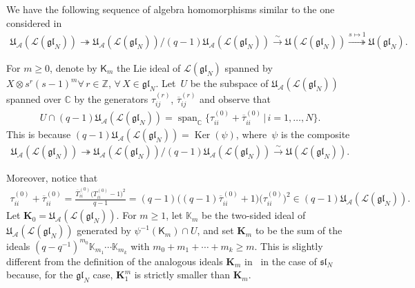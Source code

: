 \documentclass[pdftex]{sigma}
\numberwithin{theorem}{section}
\numberwithin{proposition}{section}
\numberwithin{lemma}{section}
\numberwithin{corollary}{section}
\numberwithin{definition}{section}
\numberwithin{example}{section}
\numberwithin{remark}{section}
\numberwithin{note}{section}
\DeclareMathOperator{\Ker}{Ker}
\numberwithin{equation}{section}
\begin{document}
We have the following sequence of algebra homomorphisms similar to the one considered in~\cite{GuMa}
\begin{gather*}
\mathfrak{U}_{\mathcal{A}}(\mathcal{L}(\mathfrak{gl}_N)) \twoheadrightarrow
\mathfrak{U}_{\mathcal{A}}(\mathcal{L}(\mathfrak{gl}_N)) /
(q-1)\mathfrak{U}_{\mathcal{A}}(\mathcal{L}(\mathfrak{gl}_N)) \stackrel{\sim}{\longrightarrow}
\mathfrak{U}(\mathcal{L}(\mathfrak{gl}_N)) \stackrel{s\mapsto 1}{\twoheadrightarrow}
\mathfrak{U}(\mathfrak{gl}_N).
\end{gather*}



For $m\ge 0$, denote by $\mathsf{K}_m$ the Lie ideal of $\mathcal{L}(\mathfrak{gl}_N)$
spanned by $X\otimes s^r (s-1)^m \forall\, r\in\mathbb{Z}$, $\forall\, X\in\mathfrak{gl}_N$.
Let~$U$ be the subspace of $\mathfrak{U}_{\mathcal{A}}(\mathcal{L}(\mathfrak{gl}_N))$ spanned over
$\mathbb{C}$ by the generators $\tau_{ij}^{(r)}$, $\overline{\tau}_{ij}^{(r)}$ and observe that
 \begin{gather*}
 U \cap (q-1){\mathfrak{U}}_{\mathcal{A}}({\mathcal{L}}({\mathfrak{gl}}_N))
 = \operatorname{span}_{\mathbb{C}} \big\{\tau_{ii}^{(0)}
 +\overline{\tau}_{ii}^{(0)} \,\big|\, i=1,\ldots,N\big\}.
\end{gather*}
This is because $(q-1)\mathfrak{U}_{\mathcal{A}}(\mathcal{L}(\mathfrak{gl}_N))=\Ker(\psi)$,
where~$\psi$ is the composite
\begin{gather*}
\mathfrak{U}_{\mathcal{A}}(\mathcal{L}(\mathfrak{gl}_N)) \twoheadrightarrow
\mathfrak{U}_{\mathcal{A}}(\mathcal{L}(\mathfrak{gl}_N)) /
(q-1)\mathfrak{U}_{\mathcal{A}}(\mathcal{L}(\mathfrak{gl}_N)) \stackrel{\sim}{\longrightarrow}
\mathfrak{U}(\mathcal{L}(\mathfrak{gl}_N)).
\end{gather*}

Moreover, notice that
\begin{gather*}
\tau_{ii}^{(0)}+\overline{\tau}_{ii}^{(0)} = \frac{\overline{T}_{ii}^{(0)}\big(T_{ii}^{(0)}-1\big)^2}{q-1} = (q-1)
\big((q-1)\overline{\tau}_{ii}^{(0)}+1\big) \big(\tau_{ii}^{(0)}\big)^2 \in
(q-1)\mathfrak{U}_{\mathcal{A}}(\mathcal{L}(\mathfrak{gl}_N)).
\end{gather*}
Let $\mathbf{K}_0 = \mathfrak{U}_{\mathcal{A}}(\mathcal{L}(\mathfrak{gl}_N))$.
For $m \geq 1$, let $\mathbb{K}_m$ be the two-sided ideal of
$\mathfrak{U}_{\mathcal{A}}(\mathcal{L}(\mathfrak{gl}_N))$ generated by $\psi^{-1}(\mathsf{K}_m) \cap U$, and
set $\mathbf{K}_m$ to be the sum of the ideals $(q-q^{-1})^{m_0}\mathbb{K}_{m_1} \cdots \mathbb{K}_{m_k}$ with $m_0 + m_1
+ \cdots + m_k \ge m$.
This is slightly dif\/ferent from the def\/inition of the analogous ideals $\mathbf{K}_m$ in~\cite{GuMa} in the case of
$\mathfrak{s}\mathfrak{l}_N$ because, for the $\mathfrak{gl}_N$ case, $\mathbf{K}_1^m$ is strictly smaller
than $\mathbf{K}_m$.
\end{document}
